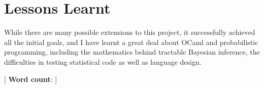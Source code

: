 \section{Lessons Learnt}
While there are many possible extensions to this project, it successfully achieved all the initial goals, and I have learnt a great deal about OCaml and probabilistic programming, including the mathematics behind tractable Bayesian inference, the difficulties in testing statistical code as well as language design.

[ {\small \textbf{Word count}: }]